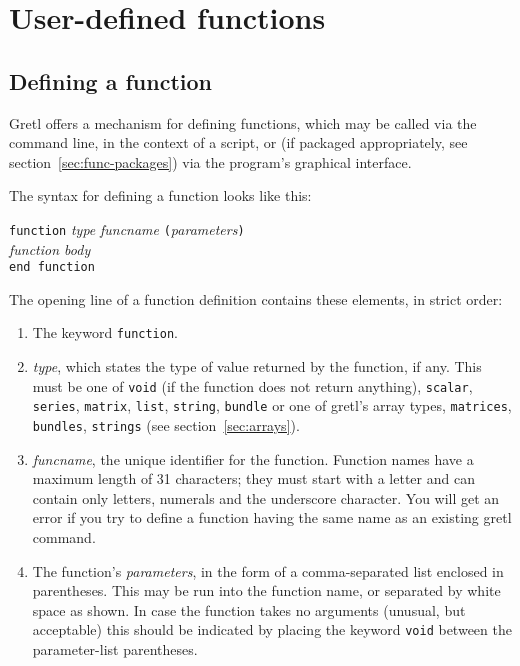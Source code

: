 \chapter{User-defined functions}
\label{chap:functions}

\section{Defining a function}
\label{func-define}

Gretl offers a mechanism for defining functions, which may be
called via the command line, in the context of a script, or (if
packaged appropriately, see section~\ref{sec:func-packages}) via the
program's graphical interface.

The syntax for defining a function looks like this:

\begin{raggedright}
\texttt{function} \textsl{type} \textsl{funcname}
\texttt{(}\textsl{parameters}\texttt{)} \\
\qquad  \textsl{function body} \\
\texttt{end function}
\end{raggedright}

The opening line of a function definition contains these elements, in
strict order:

\begin{enumerate}
\item The keyword \texttt{function}.
\item \textsl{type}, which states the type of value returned by the
  function, if any.  This must be one of \texttt{void} (if the
  function does not return anything), \texttt{scalar},
  \texttt{series}, \texttt{matrix}, \texttt{list}, \texttt{string},
  \texttt{bundle} or one of gretl's array types, \texttt{matrices},
  \texttt{bundles}, \texttt{strings} (see section~\ref{sec:arrays}).
\item \textsl{funcname}, the unique identifier for the function.
  Function names have a maximum length of 31 characters; they must
  start with a letter and can contain only letters, numerals and the
  underscore character.  You will get an error if you try to define a
  function having the same name as an existing gretl command.
\item The function's \textsl{parameters}, in the form of a
  comma-separated list enclosed in parentheses.  This may be run into
  the function name, or separated by white space as shown.  In case
  the function takes no arguments (unusual, but acceptable) this
  should be indicated by placing the keyword \texttt{void} between
  the parameter-list parentheses.
\end{enumerate}

